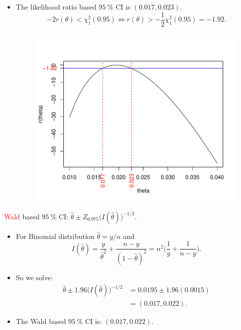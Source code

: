 \documentclass[oneside]{book}\usepackage[]{graphicx}\usepackage[svgnames]{xcolor}
\newenvironment{knitrout}{}{} %
\begin{document}
\begin{itemize}
\begin{knitrout}
\end{knitrout}
      \item The likelihood ratio based $ \qty{95}{\percent} $ CI is $(0.017, 0.023)$.
            \[ -2r(\theta)<\chi^2_1(0.95)\iff r(\theta)>-\frac{1}{2} \chi^2_1(0.95)=-1.92. \]
            \begin{figure}[!htbp]
                  \centering
                  \includegraphics{figures/1bLR.pdf}
            \end{figure}
\end{itemize}
\textcolor{Red}{Wald} based $ \qty{95}{\percent} $ CI: $ \hat{\theta}\pm Z_{0.975}\bigl(I(\hat{\theta})\bigr)^{-1/2} $.
\begin{itemize}
      \item For Binomial distribution $ \hat{\theta}=y/n $ and
            \[ I(\hat{\theta})=\frac{y}{\hat{\theta}^2}+\frac{n-y}{(1-\hat{\theta})^2}=n^2\biggl(\frac{1}{y} +\frac{1}{n-y}\biggr).   \]
      \item So we solve:
            \begin{align*}
                  \hat{\theta}\pm 1.96\bigl(I(\hat{\theta})\bigr)^{-1/2}
                   & =0.0195 \pm 1.96(0.0015) \\
                   & =(0.017, 0.022).
            \end{align*}
      \item The Wald based $ \qty{95}{\percent} $ CI is: $ (0.017, 0.022) $.
\end{itemize}
\end{document}
